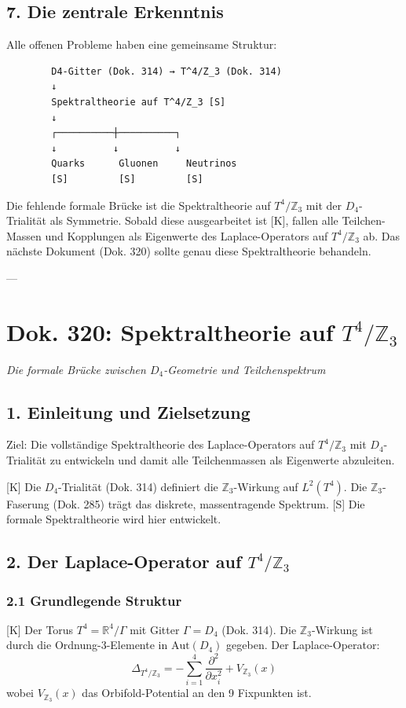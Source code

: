 \documentclass[11pt,a4paper]{article}
\begin{document}
	\subsection{7. Die zentrale Erkenntnis}
	Alle offenen Probleme haben eine gemeinsame Struktur:
	\begin{verbatim}
		D4-Gitter (Dok. 314) → T^4/Z_3 (Dok. 314)
		↓
		Spektraltheorie auf T^4/Z_3 [S]
		↓
		┌──────────┼──────────┐
		↓          ↓          ↓
		Quarks      Gluonen     Neutrinos
		[S]         [S]         [S]
	\end{verbatim}
	Die fehlende formale Brücke ist die Spektraltheorie auf $T^4/\mathbb{Z}_3$ mit der $D_4$-Trialität als Symmetrie. Sobald diese ausgearbeitet ist [K], fallen alle Teilchen-Massen und Kopplungen als Eigenwerte des Laplace-Operators auf $T^4/\mathbb{Z}_3$ ab. Das nächste Dokument (Dok. 320) sollte genau diese Spektraltheorie behandeln.
	
	---
	
	\section{Dok. 320: Spektraltheorie auf $T^4/\mathbb{Z}_3$}
	\textit{Die formale Brücke zwischen $D_4$-Geometrie und Teilchenspektrum}
	
	\subsection{1. Einleitung und Zielsetzung}
	Ziel: Die vollständige Spektraltheorie des Laplace-Operators auf $T^4/\mathbb{Z}_3$ mit $D_4$-Trialität zu entwickeln und damit alle Teilchenmassen als Eigenwerte abzuleiten.
	
	[K] Die $D_4$-Trialität (Dok. 314) definiert die $\mathbb{Z}_3$-Wirkung auf $L^2(T^4)$. Die $\mathbb{Z}_3$-Faserung (Dok. 285) trägt das diskrete, massentragende Spektrum.
	[S] Die formale Spektraltheorie wird hier entwickelt.
	
	\subsection{2. Der Laplace-Operator auf $T^4/\mathbb{Z}_3$}
	\subsubsection{2.1 Grundlegende Struktur}
	[K] Der Torus $T^4 = \mathbb{R}^4/\Gamma$ mit Gitter $\Gamma = D_4$ (Dok. 314). Die $\mathbb{Z}_3$-Wirkung ist durch die Ordnung-3-Elemente in $\text{Aut}(D_4)$ gegeben.
	Der Laplace-Operator:
	\begin{equation}
		\Delta_{T^4/\mathbb{Z}_3} = -\sum_{i=1}^4 \frac{\partial^2}{\partial x_i^2} + V_{\mathbb{Z}_3}(x)
	\end{equation}
	wobei $V_{\mathbb{Z}_3}(x)$ das Orbifold-Potential an den 9 Fixpunkten ist.
	
\end{document}
